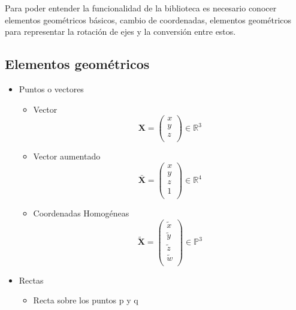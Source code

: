 \documentclass[main.tex]{subfiles}
\begin{document}
Para poder entender la funcionalidad de la biblioteca es
necesario conocer elementos geométricos básicos, cambio
de coordenadas, elementos geométricos para representar
la rotación de ejes y la conversión entre estos.

\subsection{Elementos geom\'etricos}

\begin{itemize}
\item Puntos o vectores
  \begin{itemize}
  \item Vector
    \begin{equation}
      \mathbf{X} = \left(
      \begin{array}{ccc}x \\y \\z \\\end{array} \right)
      \in{ \mathbb{R}^{3} }
    \end{equation}
  \item Vector aumentado
    \begin{equation}
      \mathbf{\bar{X}} = \left(
          \begin{array}{cccc}x \\y \\z \\1 \\
          \end{array}        \right) \in{\mathbb{R}^{4}}
    \end{equation}
  \item Coordenadas Homogéneas
    \begin{equation}
      \mathbf{\tilde{X}} = \left(
          \begin{array}{ccc}
            \tilde{x} \\ \tilde{y} \\ \tilde{z} \\ \tilde{w} \\
          \end{array}
        \right) \in \mathbb{P}^{3}
    \end{equation}
  \end{itemize}
\item Rectas
  \begin{itemize}
  \item Recta sobre los puntos p y q
    \begin{equation}

\end{equation}
\end{itemize}
\end{itemize}
\end{document}
